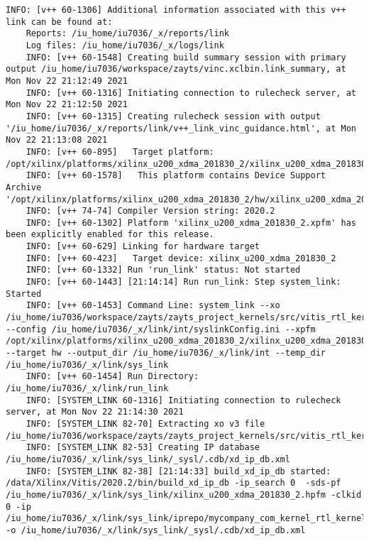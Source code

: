 \begin{lstlisting}[caption=Содержимое файла v++\_vinc.log для измененного проекта, label={log2}]
	INFO: [v++ 60-1306] Additional information associated with this v++ link can be found at:
	Reports: /iu_home/iu7036/_x/reports/link
	Log files: /iu_home/iu7036/_x/logs/link
	INFO: [v++ 60-1548] Creating build summary session with primary output /iu_home/iu7036/workspace/zayts/vinc.xclbin.link_summary, at Mon Nov 22 21:12:49 2021
	INFO: [v++ 60-1316] Initiating connection to rulecheck server, at Mon Nov 22 21:12:50 2021
	INFO: [v++ 60-1315] Creating rulecheck session with output '/iu_home/iu7036/_x/reports/link/v++_link_vinc_guidance.html', at Mon Nov 22 21:13:08 2021
	INFO: [v++ 60-895]   Target platform: /opt/xilinx/platforms/xilinx_u200_xdma_201830_2/xilinx_u200_xdma_201830_2.xpfm
	INFO: [v++ 60-1578]   This platform contains Device Support Archive '/opt/xilinx/platforms/xilinx_u200_xdma_201830_2/hw/xilinx_u200_xdma_201830_2.dsa'
	INFO: [v++ 74-74] Compiler Version string: 2020.2
	INFO: [v++ 60-1302] Platform 'xilinx_u200_xdma_201830_2.xpfm' has been explicitly enabled for this release.
	INFO: [v++ 60-629] Linking for hardware target
	INFO: [v++ 60-423]   Target device: xilinx_u200_xdma_201830_2
	INFO: [v++ 60-1332] Run 'run_link' status: Not started
	INFO: [v++ 60-1443] [21:14:14] Run run_link: Step system_link: Started
	INFO: [v++ 60-1453] Command Line: system_link --xo /iu_home/iu7036/workspace/zayts/zayts_project_kernels/src/vitis_rtl_kernel/rtl_kernel_wizard_2/rtl_kernel_wizard_2.xo --config /iu_home/iu7036/_x/link/int/syslinkConfig.ini --xpfm /opt/xilinx/platforms/xilinx_u200_xdma_201830_2/xilinx_u200_xdma_201830_2.xpfm --target hw --output_dir /iu_home/iu7036/_x/link/int --temp_dir /iu_home/iu7036/_x/link/sys_link
	INFO: [v++ 60-1454] Run Directory: /iu_home/iu7036/_x/link/run_link
	INFO: [SYSTEM_LINK 60-1316] Initiating connection to rulecheck server, at Mon Nov 22 21:14:30 2021
	INFO: [SYSTEM_LINK 82-70] Extracting xo v3 file /iu_home/iu7036/workspace/zayts/zayts_project_kernels/src/vitis_rtl_kernel/rtl_kernel_wizard_2/rtl_kernel_wizard_2.xo
	INFO: [SYSTEM_LINK 82-53] Creating IP database /iu_home/iu7036/_x/link/sys_link/_sysl/.cdb/xd_ip_db.xml
	INFO: [SYSTEM_LINK 82-38] [21:14:33] build_xd_ip_db started: /data/Xilinx/Vitis/2020.2/bin/build_xd_ip_db -ip_search 0  -sds-pf /iu_home/iu7036/_x/link/sys_link/xilinx_u200_xdma_201830_2.hpfm -clkid 0 -ip /iu_home/iu7036/_x/link/sys_link/iprepo/mycompany_com_kernel_rtl_kernel_wizard_2_1_0,rtl_kernel_wizard_2 -o /iu_home/iu7036/_x/link/sys_link/_sysl/.cdb/xd_ip_db.xml

\end{lstlisting}
